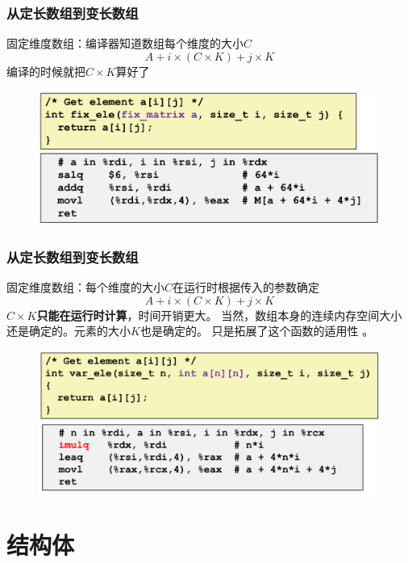 \documentclass[12pt,AutoFakeBold,aspectratio=169,mathserif]{beamer}
\begin{document}
    \begin{frame}
        \frametitle{从定长数组到变长数组}
    
        固定维度数组：编译器知道数组每个维度的大小\(C\)
        \[A+i\times (C\times K)+j\times K\]
        编译的时候就把\(C\times K\)算好了
        \begin{figure}
            \includegraphics[width=.8\textwidth]{figures/fixed.png}
        \end{figure}
    
    \end{frame}

    \begin{frame}
        \frametitle{从定长数组到变长数组}
    
        固定维度数组：每个维度的大小\(C\)在运行时根据传入的参数确定
        \[A+i\times (C\times K)+j\times K\]
        \textbf{\(C\times K\)只能在运行时计算}，时间开销更大。
% 
        当然，数组本身的连续内存空间大小还是确定的。元素的大小\(K\)也是确定的。
% 
        只是拓展了这个函数的适用性
        。
        \begin{figure}
            \includegraphics[width=.8\textwidth]{figures/var.png}
        \end{figure}
    
    \end{frame}

    \section{结构体}
\end{document}
